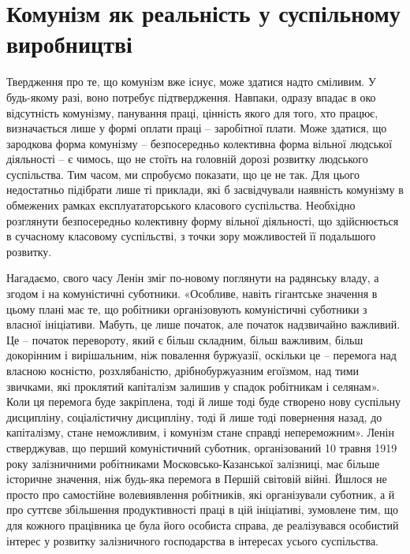 \documentclass[../main]{subfiles}
\begin{document}
\ifSubfilesClassLoaded{\setcounter{page}{19}}{}
\section{Комунізм як реальність у суспільному виробництві}
\label{sec:04_kommunizm_realnost}

Твердження про те, що комунізм вже існує, може здатися надто сміливим. У будь-якому разі, воно потребує підтвердження. Навпаки, одразу впадає в око відсутність комунізму, панування праці, цінність якого для того, хто працює, визначається лише у формі оплати праці – заробітної плати. Може здатися, що зародкова форма комунізму – безпосередньо колективна форма вільної людської діяльності – є чимось, що не стоїть на головній дорозі розвитку людського суспільства. Тим часом, ми спробуємо показати, що це не так. Для цього недостатньо підібрати лише ті приклади, які б засвідчували наявність комунізму в обмежених рамках експлуататорського класового суспільства. Необхідно розглянути безпосередньо колективну форму вільної діяльності, що здійснюється в сучасному класовому суспільстві, з точки зору можливостей її подальшого розвитку.

Нагадаємо, свого часу Ленін зміг по-новому поглянути на радянську владу, а згодом і на комуністичні суботники. «Особливе, навіть гігантське значення в цьому плані має те, що робітники організовують комуністичні суботники з власної ініціативи. Мабуть, це лише початок, але початок надзвичайно важливий. Це – початок перевороту, який є більш складним, більш важливим, більш докорінним і вирішальним, ніж повалення буржуазії, оскільки це – перемога над власною косністю, розхлябаністю, дрібнобуржуазним егоїзмом, над тими звичками, які проклятий капіталізм залишив у спадок робітникам і селянам». Коли ця перемога буде закріплена, тоді й лише тоді буде створено нову суспільну дисципліну, соціалістичну дисципліну, тоді й лише тоді повернення назад, до капіталізму, стане неможливим, і комунізм стане справді непереможним». Ленін стверджував, що перший комуністичний суботник, організований 10 травня 1919 року залізничними робітниками Московсько-Казанської залізниці, має більше історичне значення, ніж будь-яка перемога в Першій світовій війні. Йшлося не просто про самостійне волевиявлення робітників, які організували суботник, а й про суттєве збільшення продуктивності праці в цій ініціативі, зумовлене тим, що для кожного працівника це була його особиста справа, де реалізувався особистий інтерес у розвитку залізничного господарства в інтересах усього суспільства.
\end{document}
